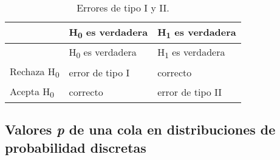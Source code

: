 \documentclass[12pt,spanish,a4paper,]{article}
\begin{document}
\begin{longtable}[]{@{}lll@{}}
\caption{Errores de tipo I y II.}\tabularnewline
\toprule
\begin{minipage}[b]{0.19\columnwidth}\raggedright
\strut
\end{minipage} & \begin{minipage}[b]{0.25\columnwidth}\raggedright
H\textsubscript{0} es verdadera\strut
\end{minipage} & \begin{minipage}[b]{0.25\columnwidth}\raggedright
H\textsubscript{1} es verdadera\strut
\end{minipage}\tabularnewline
\midrule
\endfirsthead
\toprule
\begin{minipage}[b]{0.19\columnwidth}\raggedright
\strut
\end{minipage} & \begin{minipage}[b]{0.25\columnwidth}\raggedright
H\textsubscript{0} es verdadera\strut
\end{minipage} & \begin{minipage}[b]{0.25\columnwidth}\raggedright
H\textsubscript{1} es verdadera\strut
\end{minipage}\tabularnewline
\midrule
\endhead
\begin{minipage}[t]{0.19\columnwidth}\raggedright
Rechaza H\textsubscript{0}\strut
\end{minipage} & \begin{minipage}[t]{0.25\columnwidth}\raggedright
error de tipo I\strut
\end{minipage} & \begin{minipage}[t]{0.25\columnwidth}\raggedright
correcto\strut
\end{minipage}\tabularnewline
\begin{minipage}[t]{0.19\columnwidth}\raggedright
Acepta H\textsubscript{0}\strut
\end{minipage} & \begin{minipage}[t]{0.25\columnwidth}\raggedright
correcto\strut
\end{minipage} & \begin{minipage}[t]{0.25\columnwidth}\raggedright
error de tipo II\strut
\end{minipage}\tabularnewline
\bottomrule
\end{longtable}

\hypertarget{valores-p-de-una-cola-en-distribuciones-de-probabilidad-discretas}{%
\subsection{\texorpdfstring{Valores \emph{p} de una cola en
distribuciones de probabilidad
discretas}{Valores p de una cola en distribuciones de probabilidad discretas}}\label{valores-p-de-una-cola-en-distribuciones-de-probabilidad-discretas}}
\end{document}
